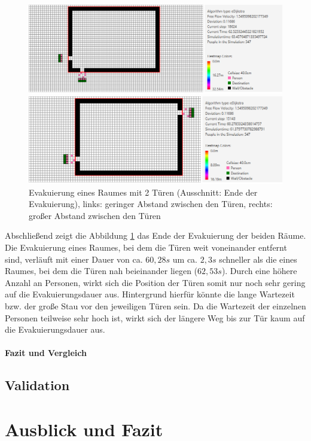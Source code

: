 \begin{figure}[!htb]
	\centering
	\begin{minipage}{.5\textwidth}
		\centering
		\includegraphics[width=\textwidth]{abbildungen/Evak2TMinDis2ENDE.PNG}
	\end{minipage}%
	\begin{minipage}{0.5\textwidth}
		\centering
		\includegraphics[width=\textwidth]{abbildungen/Evak2TMaxDis2ENDE.PNG}
	\end{minipage}
	\caption{Evakuierung eines Raumes mit 2 Türen (Ausschnitt: Ende der Evakuierung), links: geringer Abstand zwischen den Türen, rechts: großer Abstand zwischen den Türen}
	\label{fig:Evak2TminmaxDis2ENDE}
\end{figure}

Abschließend zeigt die Abbildung \ref{fig:Evak2TminmaxDis2ENDE} das Ende der Evakuierung der beiden Räume. Die Evakuierung eines Raumes, bei dem die Türen weit voneinander entfernt sind, verläuft mit einer Dauer von ca. $60,28s$ um ca. $2,3s$ schneller als die eines Raumes, bei dem die Türen nah beieinander liegen ($62,53s$). Durch eine höhere Anzahl an Personen, wirkt sich die Position der Türen somit nur noch sehr gering auf die Evakuierungsdauer aus. Hintergrund hierfür könnte die lange Wartezeit bzw. der große Stau vor den jeweiligen Türen sein. Da die Wartezeit der einzelnen Personen teilweise sehr hoch ist, wirkt sich der längere Weg bis zur Tür kaum auf die Evakuierungsdauer aus.
 
\paragraph{Fazit und Vergleich}

\subsection{Validation}

\section{Ausblick und Fazit}

%




